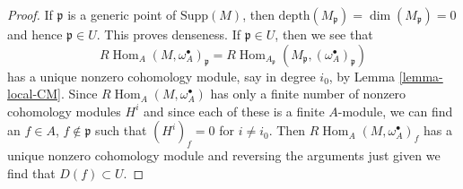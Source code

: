 \documentclass[10pt,a4paper]{amsart}
\theoremstyle{plain}
\theoremstyle{definition}
\theoremstyle{remark}
\numberwithin{equation}{subsection}
\def\Hom{\mathop{\mathrm{Hom}}\nolimits}
\begin{document}
\begin{proof}
If $\mathfrak p$ is a generic point of $\text{Supp}(M)$, then
$\text{depth}(M_\mathfrak p) = \dim(M_\mathfrak p) = 0$
and hence $\mathfrak p \in U$. This proves denseness.
If $\mathfrak p \in U$, then we see that
$$
R\Hom_A(M, \omega_A^\bullet)_\mathfrak p =
R\Hom_{A_\mathfrak p}(M_\mathfrak p, (\omega_A^\bullet)_\mathfrak p)
$$
has a unique nonzero cohomology module, say in degree $i_0$, by
Lemma \ref{lemma-local-CM}.
Since $R\Hom_A(M, \omega_A^\bullet)$
has only a finite number of nonzero cohomology modules $H^i$
and since each of these is a finite $A$-module, we can
find an $f \in A$, $f \not \in \mathfrak p$ such that
$(H^i)_f = 0$ for $i \not = i_0$. Then
$R\Hom_A(M, \omega_A^\bullet)_f$ has a unique nonzero cohomology
module and reversing the arguments just given we find
that $D(f) \subset U$.
\end{proof}
\end{document}
